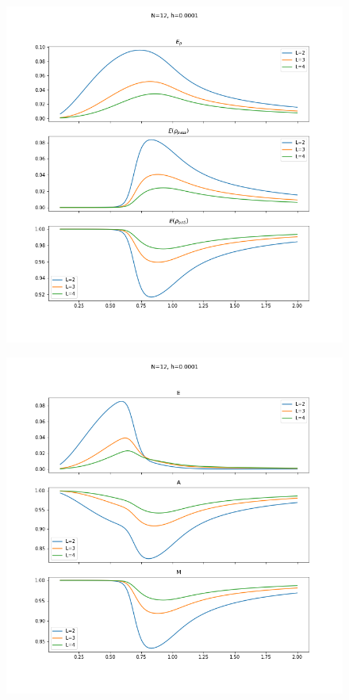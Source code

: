 \documentclass[12pt,a4paper]{article}
\begin{document}
	\begin{figure}[h]
		\centering
		\includegraphics[width=\linewidth]{h1_rhos}
		\caption{}
		\label{fig:h1rhos}
	\end{figure}
	\begin{figure}[h]
		\centering
		\includegraphics[width=\linewidth]{h1_ergos}
		\caption{}
		\label{fig:h1ergos}
	\end{figure}
\end{document}

